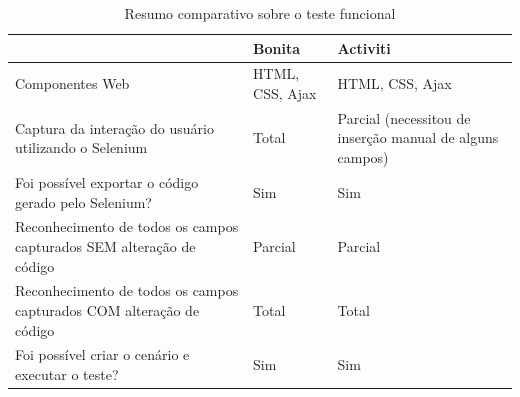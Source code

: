 \documentclass[12pt]{article}
\begin{document}
\begin{table}
\begin{center}
{\scriptsize
\begin{tabular}{p{6cm}|l|p{4.5cm}}
\hline
 & Bonita & Activiti \\\hline
Componentes Web & HTML, CSS, Ajax & HTML, CSS, Ajax \\\hline
Captura da interação do usuário utilizando o Selenium & Total & Parcial (necessitou de inser\-ção manual de alguns campos) \\\hline
Foi possível exportar o código gerado pelo Selenium? & Sim & Sim \\\hline
Reconhecimento de todos os campos capturados SEM alteração de código & Parcial & Parcial \\\hline
Reconhecimento de todos os campos capturados COM alteração de código & Total & Total \\\hline
Foi possível criar o cenário e executar o teste? & Sim & Sim \\\hline
\end{tabular}
}
\caption{Resumo comparativo sobre o teste funcional}
\label{tab:testeFuncional}
\end{center}
\end{table}








\end{document}
